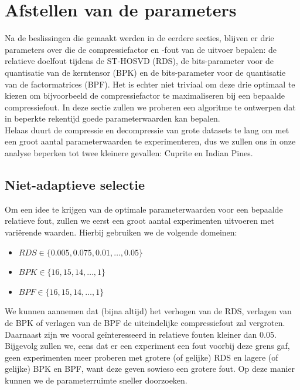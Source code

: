 \section{Afstellen van de parameters}
\label{sec:parameters}

Na de beslissingen die gemaakt werden in de eerdere secties, blijven er drie parameters over die de compressiefactor en -fout van de uitvoer bepalen: de relatieve doelfout tijdens de ST-HOSVD (RDS), de bits-parameter voor de quantisatie van de kerntensor (BPK) en de bits-parameter voor de quantisatie van de factormatrices (BPF). Het is echter niet triviaal om deze drie optimaal te kiezen om bijvoorbeeld de compressiefactor te maximaliseren bij een bepaalde compressiefout. In deze sectie zullen we proberen een algoritme te ontwerpen dat in beperkte rekentijd goede parameterwaarden kan bepalen.\\

Helaas duurt de compressie en decompressie van grote datasets te lang om met een groot aantal parameterwaarden te experimenteren, dus we zullen ons in onze analyse beperken tot twee kleinere gevallen: Cuprite en Indian Pines.

\subsection{Niet-adaptieve selectie}

Om een idee te krijgen van de optimale parameterwaarden voor een bepaalde relatieve fout, zullen we eerst een groot aantal experimenten uitvoeren met vari\"erende waarden. Hierbij gebruiken we de volgende domeinen:

\begin{itemize}
\item $RDS \in \{0.005, 0.075, 0.01, \dots, 0.05\}$
\item $BPK \in \{16, 15, 14, \dots, 1\}$
\item $BPF \in \{16, 15, 14, \dots, 1\}$
\end{itemize}

We kunnen aannemen dat (bijna altijd) het verhogen van de RDS, verlagen van de BPK of verlagen van de BPF de uiteindelijke compressiefout zal vergroten. Daarnaast zijn we vooral ge\"interesseerd in relatieve fouten kleiner dan 0.05. Bijgevolg zullen we, eens dat er een experiment een fout voorbij deze grens gaf, geen experimenten meer proberen met grotere (of gelijke) RDS en lagere (of gelijke) BPK en BPF, want deze geven sowieso een grotere fout. Op deze manier kunnen we de parameterruimte sneller doorzoeken.

